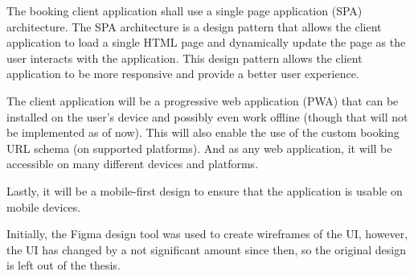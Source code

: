 The booking client application shall use a single page application (SPA) architecture. The SPA architecture is a design pattern that allows the client application to load a single HTML page and dynamically update the page as the user interacts with the application. This design pattern allows the client application to be more responsive and provide a better user experience.

The client application will be a progressive web application (PWA) that can be installed on the user's device and possibly even work offline (though that will not be implemented as of now). This will also enable the use of the custom booking URL schema (on supported platforms). And as any web application, it will be accessible on many different devices and platforms.

Lastly, it will be a mobile-first design to ensure that the application is usable on mobile devices.

Initially, the Figma design tool was used to create wireframes of the UI, however, the UI has changed by a not significant amount since then, so the original design is left out of the thesis.
